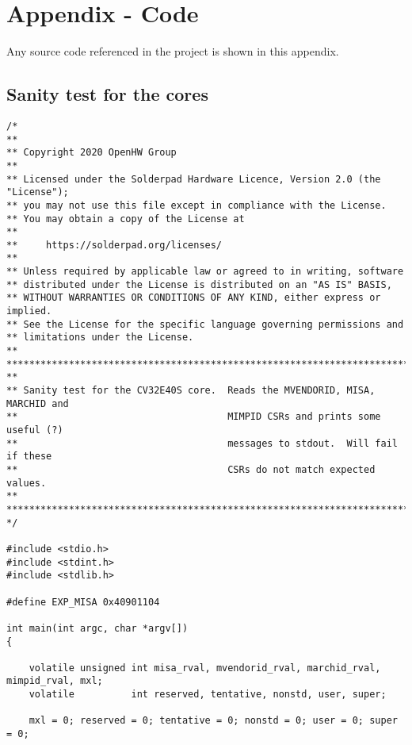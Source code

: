 \chapter{Appendix - Code}
\label{app:appx1}

Any source code referenced in the project is shown in this appendix. 

\section{Sanity test for the cores}
\label{app:helloworldC}

\lstset{ 
   language=C,                   %
   breaklines=true,                %
   breakatwhitespace=false,        %
}
\begin{lstlisting}[caption={Sanity test for the cores.}, label=lst:sample_code]
    /*
**
** Copyright 2020 OpenHW Group
**
** Licensed under the Solderpad Hardware Licence, Version 2.0 (the "License");
** you may not use this file except in compliance with the License.
** You may obtain a copy of the License at
**
**     https://solderpad.org/licenses/
**
** Unless required by applicable law or agreed to in writing, software
** distributed under the License is distributed on an "AS IS" BASIS,
** WITHOUT WARRANTIES OR CONDITIONS OF ANY KIND, either express or implied.
** See the License for the specific language governing permissions and
** limitations under the License.
**
*******************************************************************************
**
** Sanity test for the CV32E40S core.  Reads the MVENDORID, MISA, MARCHID and
**                                     MIMPID CSRs and prints some useful (?)
**                                     messages to stdout.  Will fail if these
**                                     CSRs do not match expected values.
**
*******************************************************************************
*/

#include <stdio.h>
#include <stdint.h>
#include <stdlib.h>

#define EXP_MISA 0x40901104

int main(int argc, char *argv[])
{

    volatile unsigned int misa_rval, mvendorid_rval, marchid_rval, mimpid_rval, mxl;
    volatile          int reserved, tentative, nonstd, user, super;

    mxl = 0; reserved = 0; tentative = 0; nonstd = 0; user = 0; super = 0;


\end{lstlisting}
